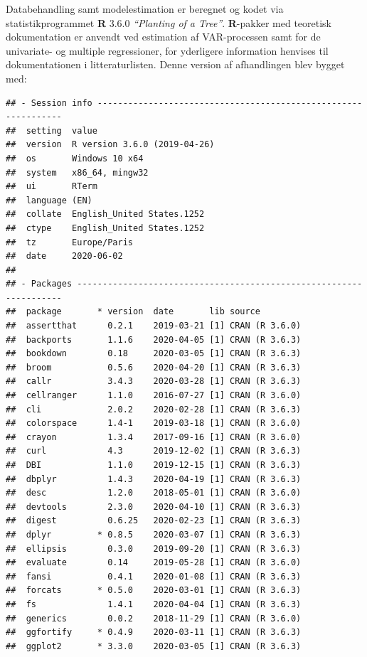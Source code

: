 \documentclass[
  a4paper,
  oneside]{memoir}
\begin{document}
Databehandling samt modelestimation er beregnet og kodet via statistikprogrammet \textbf{R} 3.6.0 \emph{``Planting of a Tree''}. \textbf{R}-pakker med teoretisk dokumentation er anvendt ved estimation af VAR-processen samt for de univariate- og multiple regressioner, for yderligere information henvises til dokumentationen i litteraturlisten. Denne version af afhandlingen blev bygget med:

\begin{verbatim}
## - Session info ---------------------------------------------------------------
##  setting  value                       
##  version  R version 3.6.0 (2019-04-26)
##  os       Windows 10 x64              
##  system   x86_64, mingw32             
##  ui       RTerm                       
##  language (EN)                        
##  collate  English_United States.1252  
##  ctype    English_United States.1252  
##  tz       Europe/Paris                
##  date     2020-06-02                  
## 
## - Packages -------------------------------------------------------------------
##  package       * version  date       lib source           
##  assertthat      0.2.1    2019-03-21 [1] CRAN (R 3.6.0)   
##  backports       1.1.6    2020-04-05 [1] CRAN (R 3.6.3)   
##  bookdown        0.18     2020-03-05 [1] CRAN (R 3.6.3)   
##  broom           0.5.6    2020-04-20 [1] CRAN (R 3.6.3)   
##  callr           3.4.3    2020-03-28 [1] CRAN (R 3.6.3)   
##  cellranger      1.1.0    2016-07-27 [1] CRAN (R 3.6.0)   
##  cli             2.0.2    2020-02-28 [1] CRAN (R 3.6.3)   
##  colorspace      1.4-1    2019-03-18 [1] CRAN (R 3.6.0)   
##  crayon          1.3.4    2017-09-16 [1] CRAN (R 3.6.0)   
##  curl            4.3      2019-12-02 [1] CRAN (R 3.6.3)   
##  DBI             1.1.0    2019-12-15 [1] CRAN (R 3.6.3)   
##  dbplyr          1.4.3    2020-04-19 [1] CRAN (R 3.6.3)   
##  desc            1.2.0    2018-05-01 [1] CRAN (R 3.6.0)   
##  devtools        2.3.0    2020-04-10 [1] CRAN (R 3.6.3)   
##  digest          0.6.25   2020-02-23 [1] CRAN (R 3.6.3)   
##  dplyr         * 0.8.5    2020-03-07 [1] CRAN (R 3.6.3)   
##  ellipsis        0.3.0    2019-09-20 [1] CRAN (R 3.6.3)   
##  evaluate        0.14     2019-05-28 [1] CRAN (R 3.6.0)   
##  fansi           0.4.1    2020-01-08 [1] CRAN (R 3.6.3)   
##  forcats       * 0.5.0    2020-03-01 [1] CRAN (R 3.6.3)   
##  fs              1.4.1    2020-04-04 [1] CRAN (R 3.6.3)   
##  generics        0.0.2    2018-11-29 [1] CRAN (R 3.6.0)   
##  ggfortify     * 0.4.9    2020-03-11 [1] CRAN (R 3.6.3)   
##  ggplot2       * 3.3.0    2020-03-05 [1] CRAN (R 3.6.3)   

\end{verbatim}
\end{document}
